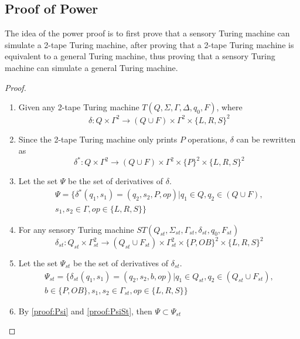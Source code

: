 \subsection{Proof of Power}
The idea of the power proof is to first prove that a sensory Turing machine can simulate a 2-tape Turing machine, after proving that a 2-tape Turing machine is equivalent to a general Turing machine, thus proving that a sensory Turing machine can simulate a general Turing machine.
\begin{proof}\label{proof:Power}
\begin{enumerate}
    \item Given any 2-tape Turing machine $T(Q,\Sigma, \Gamma, \Delta, q_0, F)$, where 
    \begin{equation}
        \delta: Q \times \Gamma^2 \to (Q\cup F)\times \Gamma^2 \times \{L, R, S\}^2
    \end{equation}
    \item Since the 2-tape Turing machine only prints $P$ operations, $\delta$ can be rewritten as
    \begin{equation}
        \delta^*: Q \times \Gamma^2 \to (Q\cup F)\times \Gamma^2 \times \{P\}^2 \times \{L, R, S\}^2
    \end{equation}
    \item \label{proof:Psi} Let the set $\Psi$ be the set of derivatives of $\delta$.
    \begin{align}
        \nonumber \Psi = \{\delta^*(q_1,s_1)=(q_2, s_2, P, op) | q_1 \in Q, q_2 \in (Q\cup F), \\
        s_1, s_2\in\Gamma, op\in\{L,R,S\}\}
    \end{align}
    \item For any sensory Turing machine $ST(Q_{st},\Sigma_{st},\Gamma_{st},\delta_{st},q_0,F_{st})$
    \begin{equation}
        \delta_{st}: Q_{st} \times \Gamma_{st}^2 \to (Q_{st}\cup F_{st})\times \Gamma_{st}^2 \times \{P, OB\}^2 \times \{L, R, S\}^2
    \end{equation}
    \item \label{proof:PsiSt} Let the set $\Psi_{st}$ be the set of derivatives of $\delta_{st}$.
    \begin{align}
        \nonumber \Psi_{st} = \{\delta_{st}(q_1,s_1)=(q_2, s_2, b, op) | q_1 \in Q_{st}, q_2 \in (Q_{st}\cup F_{st}), \\
        b\in \{P, OB\},s_1, s_2\in\Gamma_{st}, op\in\{L,R,S\}\}
    \end{align}
    \item By \ref{proof:Psi} and \ref{proof:PsiSt}, then $\Psi \subset \Psi_{st}$

\end{enumerate}
\end{proof}
